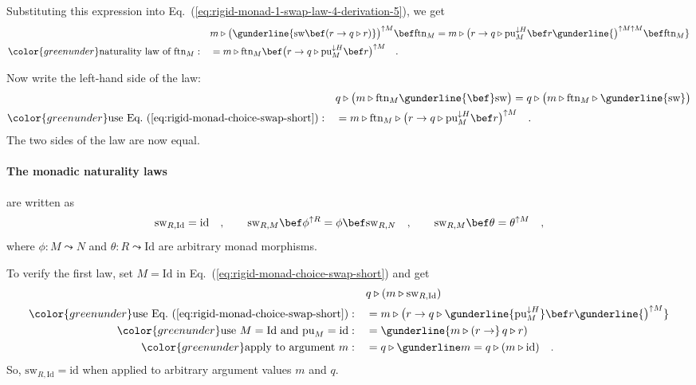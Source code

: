 Substituting this expression into Eq.~(\ref{eq:rigid-monad-1-swap-law-4-derivation-5}),
we get
\begin{align*}
 & m\triangleright\big(\gunderline{\text{sw}\bef(r\rightarrow q\triangleright r)}\big)^{\uparrow M}\bef\text{ftn}_{M}=m\triangleright\big(r\rightarrow q\triangleright\text{pu}_{M}^{\downarrow H}\bef r\gunderline{\big)^{\uparrow M\uparrow M}\bef\text{ftn}_{M}}\\
{\color{greenunder}\text{naturality law of }\text{ftn}_{M}:}\quad & =m\triangleright\text{ftn}_{M}\bef\big(r\rightarrow q\triangleright\text{pu}_{M}^{\downarrow H}\bef r\big)^{\uparrow M}\quad.
\end{align*}

Now write the left-hand side of the law:
\begin{align*}
 & q\triangleright\big(m\triangleright\text{ftn}_{M}\gunderline{\bef}\text{sw}\big)=q\triangleright\big(m\triangleright\text{ftn}_{M}\triangleright\gunderline{\text{sw}}\big)\\
{\color{greenunder}\text{use Eq.~(\ref{eq:rigid-monad-choice-swap-short})}:}\quad & =m\triangleright\text{ftn}_{M}\triangleright\big(r\rightarrow q\triangleright\text{pu}_{M}^{\downarrow H}\bef r\big)^{\uparrow M}\quad.
\end{align*}
The two sides of the law are now equal.

\paragraph{The monadic naturality laws}

are written as
\[
\text{sw}_{R,\text{Id}}=\text{id}\quad,\quad\quad\text{sw}_{R,M}\bef\phi^{\uparrow R}=\phi\bef\text{sw}_{R,N}\quad,\quad\quad\text{sw}_{R,M}\bef\theta=\theta^{\uparrow M}\quad,
\]
where $\phi:M\leadsto N$ and $\theta:R\leadsto\text{Id}$ are arbitrary
monad morphisms. 

To verify the first law, set $M=\text{Id}$ in Eq.~(\ref{eq:rigid-monad-choice-swap-short})
and get
\begin{align*}
 & q\triangleright(m\triangleright\text{sw}_{R,\text{Id}})\\
{\color{greenunder}\text{use Eq.~(\ref{eq:rigid-monad-choice-swap-short})}:}\quad & =m\triangleright\big(r\rightarrow q\triangleright\gunderline{\text{pu}_{M}^{\downarrow H}}\bef r\gunderline{\big)^{\uparrow M}}\\
{\color{greenunder}\text{use }M=\text{Id}\text{ and }\text{pu}_{M}=\text{id}:}\quad & =\gunderline{m\triangleright(r\rightarrow}\,q\triangleright r)\\
{\color{greenunder}\text{apply to argument }m:}\quad & =q\triangleright\gunderline m=q\triangleright(m\triangleright\text{id})\quad.
\end{align*}
So, $\text{sw}_{R,\text{Id}}=\text{id}$ when applied to arbitrary
argument values $m$ and $q$.

